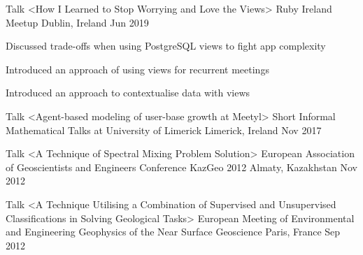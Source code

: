 

\begin{cventries}

  \cventry
    {Talk <How I Learned to Stop Worrying and Love the Views>} %
    {Ruby Ireland Meetup} %
    {Dublin, Ireland} %
    {Jun 2019} %
    {
      \begin{cvitems} %
        \item {Discussed trade-offs when using PostgreSQL views to fight app complexity}
        \item {Introduced an approach of using views for recurrent meetings}
        \item {Introduced an approach to contextualise data with views}
      \end{cvitems}
    }

  \cventry
    {Talk <Agent-based modeling of user-base growth at Meetyl>} %
    {Short Informal Mathematical Talks at University of Limerick} %
    {Limerick, Ireland} %
    {Nov 2017} %
    {}

  \cventry
    {Talk <A Technique of Spectral Mixing Problem Solution>} %
    {European Association of Geoscientists and Engineers Conference KazGeo 2012} %
    {Almaty, Kazakhstan} %
    {Nov 2012} %
    {}

  \cventry
    {Talk <A Technique Utilising a Combination of Supervised and Unsupervised Classifications in Solving Geological Tasks>} %
    {European Meeting of Environmental and Engineering Geophysics of the Near Surface Geoscience} %
    {Paris, France} %
    {Sep 2012} %
    {}

\end{cventries}
